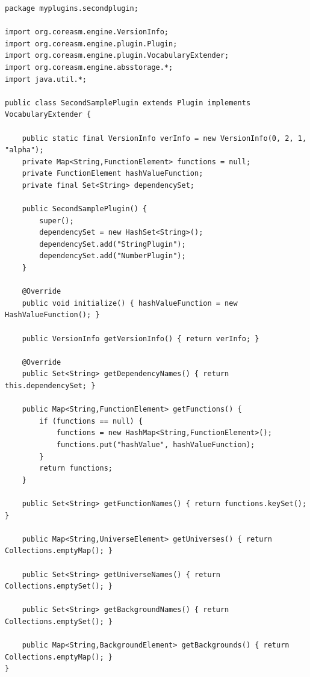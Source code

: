 \documentclass{article}
\begin{document}
\begin{program}
\small
\begin{verbatim}
package myplugins.secondplugin;

import org.coreasm.engine.VersionInfo;
import org.coreasm.engine.plugin.Plugin;
import org.coreasm.engine.plugin.VocabularyExtender;
import org.coreasm.engine.absstorage.*;
import java.util.*;

public class SecondSamplePlugin extends Plugin implements VocabularyExtender {

    public static final VersionInfo verInfo = new VersionInfo(0, 2, 1, "alpha");
    private Map<String,FunctionElement> functions = null;
    private FunctionElement hashValueFunction;
    private final Set<String> dependencySet;

    public SecondSamplePlugin() {
        super();
        dependencySet = new HashSet<String>();
        dependencySet.add("StringPlugin");
        dependencySet.add("NumberPlugin");
    }

    @Override
    public void initialize() { hashValueFunction = new HashValueFunction(); }

    public VersionInfo getVersionInfo() { return verInfo; }

    @Override
    public Set<String> getDependencyNames() { return this.dependencySet; }
	
    public Map<String,FunctionElement> getFunctions() {
        if (functions == null) {
            functions = new HashMap<String,FunctionElement>();
            functions.put("hashValue", hashValueFunction);
        }
        return functions;
    }

    public Set<String> getFunctionNames() { return functions.keySet(); }

    public Map<String,UniverseElement> getUniverses() { return Collections.emptyMap(); }

    public Set<String> getUniverseNames() { return Collections.emptySet(); }

    public Set<String> getBackgroundNames() { return Collections.emptySet(); }

    public Map<String,BackgroundElement> getBackgrounds() { return Collections.emptyMap(); }
}
\end{verbatim}
\caption{}
\label{pro:secondplugin}
\end{program}



\printindex
\end{document}
